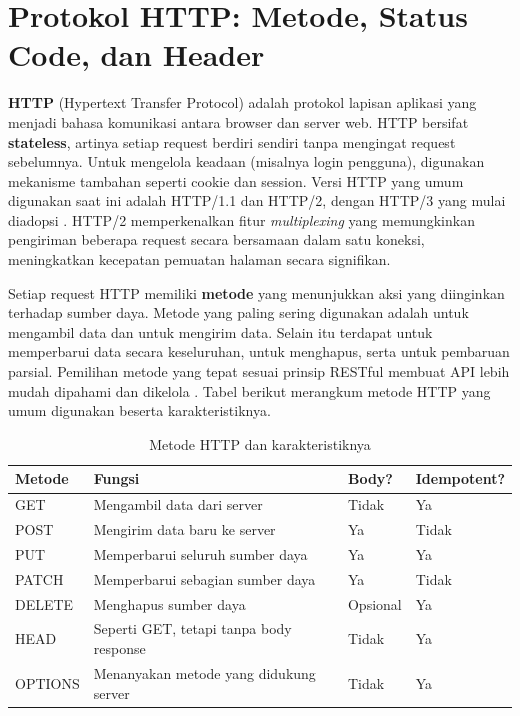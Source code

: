 ﻿\section{Protokol HTTP: Metode, Status Code, dan Header}
\textbf{HTTP} (Hypertext Transfer Protocol) adalah protokol lapisan aplikasi yang menjadi bahasa komunikasi antara browser dan server web. HTTP bersifat \textbf{stateless}, artinya setiap request berdiri sendiri tanpa mengingat request sebelumnya. Untuk mengelola keadaan (misalnya login pengguna), digunakan mekanisme tambahan seperti cookie dan session. Versi HTTP yang umum digunakan saat ini adalah HTTP/1.1 dan HTTP/2, dengan HTTP/3 yang mulai diadopsi \cite{mdnLearn}. HTTP/2 memperkenalkan fitur \textit{multiplexing} yang memungkinkan pengiriman beberapa request secara bersamaan dalam satu koneksi, meningkatkan kecepatan pemuatan halaman secara signifikan.

Setiap request HTTP memiliki \textbf{metode} yang menunjukkan aksi yang diinginkan terhadap sumber daya. Metode yang paling sering digunakan adalah  untuk mengambil data dan  untuk mengirim data. Selain itu terdapat  untuk memperbarui data secara keseluruhan,  untuk menghapus, serta  untuk pembaruan parsial. Pemilihan metode yang tepat sesuai prinsip RESTful membuat API lebih mudah dipahami dan dikelola \cite{webdevLearn}. Tabel berikut merangkum metode HTTP yang umum digunakan beserta karakteristiknya.

\begin{table}[H]
\centering
\begin{tabular}{|P{2cm}|P{4cm}|P{2cm}|P{3.5cm}|}
\hline
\textbf{Metode} & \textbf{Fungsi} & \textbf{Body?} & \textbf{Idempotent?} \\
\hline
GET & Mengambil data dari server & Tidak & Ya \\
\hline
POST & Mengirim data baru ke server & Ya & Tidak \\
\hline
PUT & Memperbarui seluruh sumber daya & Ya & Ya \\
\hline
PATCH & Memperbarui sebagian sumber daya & Ya & Tidak \\
\hline
DELETE & Menghapus sumber daya & Opsional & Ya \\
\hline
HEAD & Seperti GET, tetapi tanpa body response & Tidak & Ya \\
\hline
OPTIONS & Menanyakan metode yang didukung server & Tidak & Ya \\
\hline
\end{tabular}
\caption{Metode HTTP dan karakteristiknya}
\end{table}

